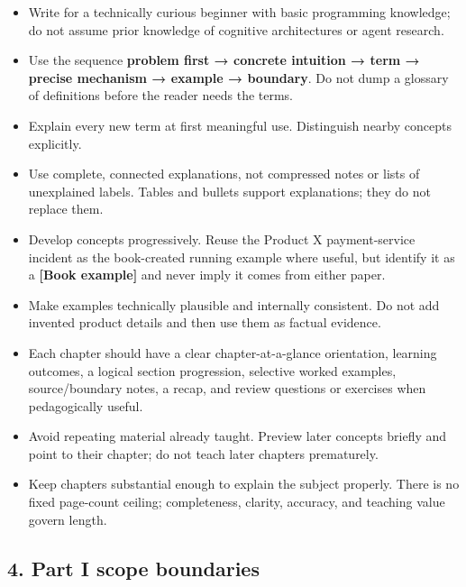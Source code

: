 \begin{itemize}
\tightlist
\item
  Write for a technically curious beginner with basic programming
  knowledge; do not assume prior knowledge of cognitive architectures or
  agent research.
\item
  Use the sequence \textbf{problem first → concrete intuition → term →
  precise mechanism → example → boundary}. Do not dump a glossary of
  definitions before the reader needs the terms.
\item
  Explain every new term at first meaningful use. Distinguish nearby
  concepts explicitly.
\item
  Use complete, connected explanations, not compressed notes or lists of
  unexplained labels. Tables and bullets support explanations; they do
  not replace them.
\item
  Develop concepts progressively. Reuse the Product X payment-service
  incident as the book-created running example where useful, but
  identify it as a \textbf{{[}Book example{]}} and never imply it comes
  from either paper.
\item
  Make examples technically plausible and internally consistent. Do not
  add invented product details and then use them as factual evidence.
\item
  Each chapter should have a clear chapter-at-a-glance orientation,
  learning outcomes, a logical section progression, selective worked
  examples, source/boundary notes, a recap, and review questions or
  exercises when pedagogically useful.
\item
  Avoid repeating material already taught. Preview later concepts
  briefly and point to their chapter; do not teach later chapters
  prematurely.
\item
  Keep chapters substantial enough to explain the subject properly.
  There is no fixed page-count ceiling; completeness, clarity, accuracy,
  and teaching value govern length.
\end{itemize}

\subsection{4. Part I scope boundaries}\label{4-part-i-scope-boundaries}

